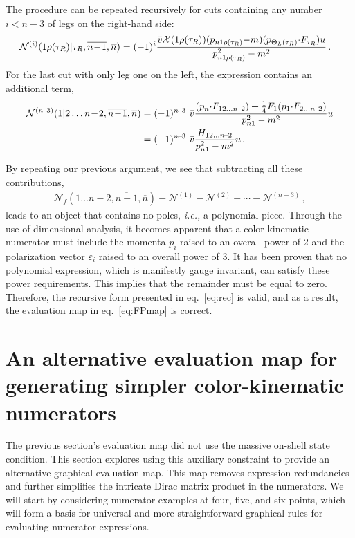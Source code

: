 \documentclass[a4paper,12pt]{article}
\makeatletter
\def\sc#1{\overline{#1}}
\def\nn{\nonumber}
\newcommand{\npre}{\mathcal{N}}
\newcommand{\mdot}{{\cdot}}
\newcommand*{\bigcdot}{}%
\DeclareRobustCommand*{\bigcdot}{%
  \mathbin{\mathpalette\bigcdot@{}}%
}
\newcommand*{\bigcdot@scalefactor}{.6}
\newcommand*{\bigcdot@widthfactor}{1.25}
\newcommand*{\bigcdot@}[2]{%
  \sbox0{$#1\vcenter{}$}%
  \sbox2{$#1\cdot\m@th$}%
  \hbox to \bigcdot@widthfactor\wd2{%
    \hfil
    \raise\ht0\hbox{%
      \scalebox{\bigcdot@scalefactor}{%
        \lower\ht0\hbox{$#1\bullet\m@th$}%
      }%
    }%
    \hfil
  }%
}
\newcommand{\dd}{\bigcdot}
\makeatother
\begin{document}
The procedure can be repeated recursively for cuts containing any number $i<n\!-\!3$ of legs on the right-hand side:
%
\begin{align}
     &\npre^{(i)}(1\rho{(\tau_R)}|\tau_R, \sc {n\!-\!1},\sc n)=(-1)^{i} { \bar v \dd {\cal X}(1\rho{(\tau_R)})\dd (p_{n1\rho{(\tau_R)}}{-}m) \dd (p_{\Theta_L(\tau_R)}\mdot F_{\tau_R})\dd u \over p^2_{n1\rho{(\tau_R)}}-m^2} \, .
\end{align}
%
For the last cut with only leg one on the left, the expression contains an additional term, 
%
\begin{align}
    \npre^{(n\!-\!3)}(1|2\ldots n\!-\!2, \sc {n\!-\!1},\sc n)
    &=(-1)^{n\!-\!3} \ \bar v\dd {(p_n\mdot F_{12\ldots n\!-\!2}) + \frac{1}{4}{F_1} \dd (p_1 \mdot F_{2\ldots n\!-\!2})\over p^2_{n1}-m^2}\dd u \nn\\
    &=(-1)^{n\!-\!3} \ \bar v\dd {H_{12\ldots n\!-\!2}\over p^2_{n1}-m^2}\dd u \, .
\end{align}
%

By repeating our previous argument, we see that subtracting all these contributions, 
%
\begin{align}
    \npre_f(1\ldots n\!-\!2, \sc {n\!-\!1},\sc n)-\npre^{(1)}-\npre^{(2)}-\cdots- \npre^{(n\!-\!3)}\,,
\end{align}
%
leads to an object that contains no poles, {\it {\it i.e.},} a polynomial piece. Through the use of dimensional analysis, it becomes apparent that a color-kinematic numerator must include the momenta $p_i$ raised to an overall power of $2$ and the polarization vector $\varepsilon_i$ raised to an overall power of $3$. It has been proven that no polynomial expression, which is manifestly gauge invariant, can satisfy these power requirements. This implies that the remainder must be equal to zero. Therefore, the recursive form presented in eq.~\eqref{eq:rec} is valid, and as a result, the evaluation map in eq.~\eqref{eq:FPmap} is correct.

\section{An alternative evaluation map for generating simpler color-kinematic numerators}\label{sec:map2}
The previous section's evaluation map did not use the massive on-shell state condition. This section explores using this auxiliary constraint to provide an alternative graphical evaluation map. This map removes expression redundancies and further simplifies the intricate Dirac matrix product in the numerators. We will start by considering numerator examples at four, five, and six points, which will form a basis for universal and more straightforward graphical rules for evaluating numerator expressions. 
\end{document}
